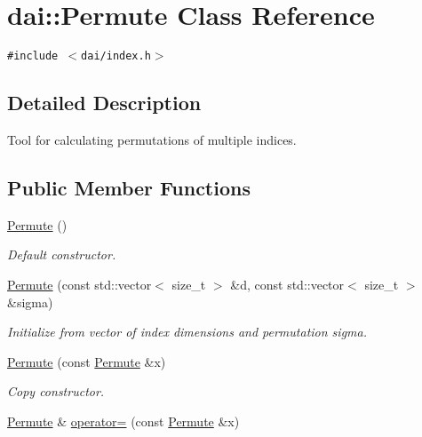 \hypertarget{classdai_1_1Permute}{
\section{dai::Permute Class Reference}
\label{classdai_1_1Permute}
}
{\tt \#include $<$dai/index.h$>$}



\subsection{Detailed Description}
Tool for calculating permutations of multiple indices. \subsection*{Public Member Functions}
\begin{CompactItemize}
\item 
\hypertarget{classdai_1_1Permute_138f021554272c9601e4cf6a25e6f62b}{
\hyperlink{classdai_1_1Permute_138f021554272c9601e4cf6a25e6f62b}{Permute} ()}
\label{classdai_1_1Permute_138f021554272c9601e4cf6a25e6f62b}

\begin{CompactList}\small\item\em Default constructor. \item\end{CompactList}\item 
\hypertarget{classdai_1_1Permute_d1af25b04480a33721e2f56e88cb0e25}{
\hyperlink{classdai_1_1Permute_d1af25b04480a33721e2f56e88cb0e25}{Permute} (const std::vector$<$ size\_\-t $>$ \&d, const std::vector$<$ size\_\-t $>$ \&sigma)}
\label{classdai_1_1Permute_d1af25b04480a33721e2f56e88cb0e25}

\begin{CompactList}\small\item\em Initialize from vector of index dimensions and permutation sigma. \item\end{CompactList}\item 
\hypertarget{classdai_1_1Permute_39b079d34fee292434e15faf136fd506}{
\hyperlink{classdai_1_1Permute_39b079d34fee292434e15faf136fd506}{Permute} (const \hyperlink{classdai_1_1Permute}{Permute} \&x)}
\label{classdai_1_1Permute_39b079d34fee292434e15faf136fd506}

\begin{CompactList}\small\item\em Copy constructor. \item\end{CompactList}\item 
\hypertarget{classdai_1_1Permute_99e896b039f3b9f6b737ccecba7dfdb5}{
\hyperlink{classdai_1_1Permute}{Permute} \& \hyperlink{classdai_1_1Permute_99e896b039f3b9f6b737ccecba7dfdb5}{operator=} (const \hyperlink{classdai_1_1Permute}{Permute} \&x)}
\label{classdai_1_1Permute_99e896b039f3b9f6b737ccecba7dfdb5}


\end{CompactItemize}
